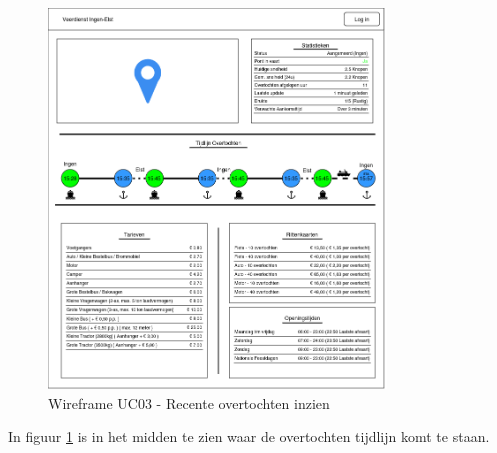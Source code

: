 \documentclass{article}
\begin{document}
\begin{figure}[H]
    \centering
    \includegraphics[width=0.8\textwidth]{images/wireframe_startpagina.png}
    \caption{Wireframe UC03 - Recente overtochten inzien}
    \label{fig:wf3}
\end{figure}
In figuur \ref{fig:wf3} is in het midden te zien waar de overtochten tijdlijn komt te staan.
\end{document}
